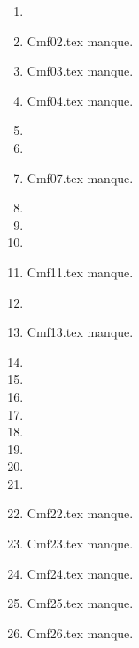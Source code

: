 \begin{enumerate}
  \item  
  \item Cmf02.tex manque. 
  \item Cmf03.tex manque. 
  \item Cmf04.tex manque. 
  \item  
  \item  
  \item Cmf07.tex manque. 
  \item  
  \item  
  \item  
  \item Cmf11.tex manque. 
  \item  
  \item Cmf13.tex manque. 
  \item  
  \item  
  \item  
  \item  
  \item  
  \item  
  \item  
  \item  
  \item Cmf22.tex manque. 
  \item Cmf23.tex manque. 
  \item Cmf24.tex manque. 
  \item Cmf25.tex manque. 
  \item Cmf26.tex manque. 
\end{enumerate} 
